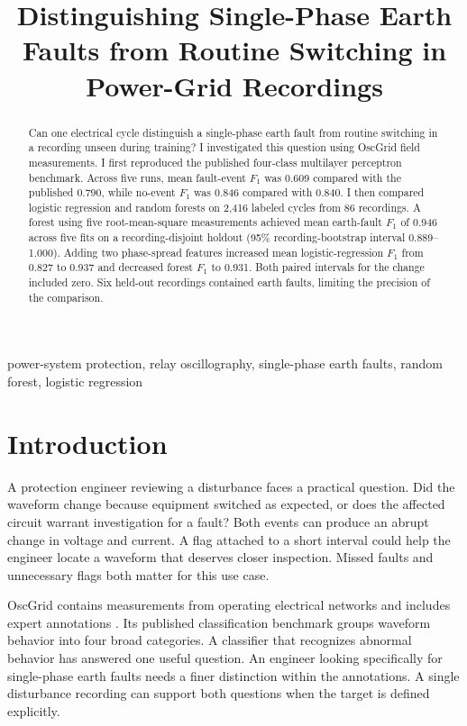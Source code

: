 \documentclass[11pt,conference,letterpaper]{IEEEtran}
\title{Distinguishing Single-Phase Earth Faults from Routine Switching in Power-Grid Recordings}
\author{\IEEEauthorblockN{Md. Aslam Hossain}\IEEEauthorblockA{Department of Electrical and Computer Engineering\\The University of Alabama in Huntsville, Huntsville, Alabama, USA\\mh0708@uah.edu}}
\newcommand{\F}{\ensuremath{F_1}}
\begin{document}
\maketitle
\begin{abstract}
Can one electrical cycle distinguish a single-phase earth fault from routine switching in a recording unseen during training? I investigated this question using OscGrid field measurements. I first reproduced the published four-class multilayer perceptron benchmark. Across five runs, mean fault-event \F{} was 0.609 compared with the published 0.790, while no-event \F{} was 0.846 compared with 0.840. I then compared logistic regression and random forests on 2,416 labeled cycles from 86 recordings. A forest using five root-mean-square measurements achieved mean earth-fault \F{} of 0.946 across five fits on a recording-disjoint holdout (95\% recording-bootstrap interval 0.889--1.000). Adding two phase-spread features increased mean logistic-regression \F{} from 0.827 to 0.937 and decreased forest \F{} to 0.931. Both paired intervals for the change included zero. Six held-out recordings contained earth faults, limiting the precision of the comparison.
\end{abstract}
\begin{IEEEkeywords}power-system protection, relay oscillography, single-phase earth faults, random forest, logistic regression\end{IEEEkeywords}
\section{Introduction}
A protection engineer reviewing a disturbance faces a practical question. Did the waveform change because equipment switched as expected, or does the affected circuit warrant investigation for a fault? Both events can produce an abrupt change in voltage and current. A flag attached to a short interval could help the engineer locate a waveform that deserves closer inspection. Missed faults and unnecessary flags both matter for this use case.

OscGrid contains measurements from operating electrical networks and includes expert annotations \cite{osc,data}. Its published classification benchmark groups waveform behavior into four broad categories. A classifier that recognizes abnormal behavior has answered one useful question. An engineer looking specifically for single-phase earth faults needs a finer distinction within the annotations. A single disturbance recording can support both questions when the target is defined explicitly.
\end{document}
